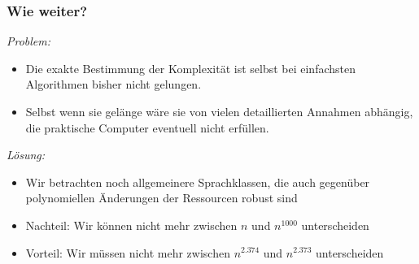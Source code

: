 \documentclass[aspectratio=1610,onlymath]{beamer}
\begin{document}
\begin{frame}\frametitle{Wie weiter?}


\emph{Problem:}
\begin{itemize}
\item Die exakte Bestimmung der Komplexität ist selbst bei einfachsten Algorithmen bisher nicht gelungen.
\item Selbst wenn sie gelänge wäre sie von vielen detaillierten Annahmen abhängig, die praktische Computer eventuell nicht erfüllen.
\end{itemize}
\bigskip\pause

\emph{Lösung:}
\begin{itemize}
\item Wir betrachten \alert{noch allgemeinere Sprachklassen}, die auch gegenüber polynomiellen Änderungen der Ressourcen robust sind
\item Nachteil: Wir können nicht mehr zwischen $n$ und $n^{1000}$ unterscheiden
\item Vorteil: Wir müssen nicht mehr zwischen $n^{2.374}$ und $n^{2.373}$ unterscheiden
\end{itemize}

\end{frame}
\end{document}
